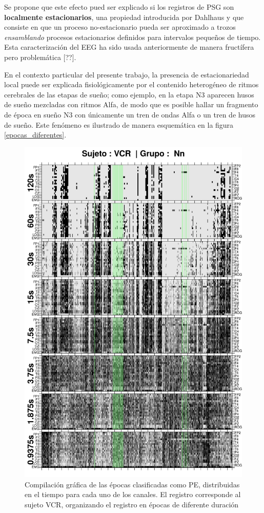 Se propone que este efecto pued ser explicado si los registros de PSG son \textbf{localmente
estacionarios}, una propiedad introducida por Dahlhaus \cite{Dahlhaus97} y que consiste en que un
proceso no-estacionario pueda ser aproximado a trozos \textit{ensamblando} procesos estacionarios
definidos para intervalos pequeños de tiempo.
Esta caracterización del EEG ha sido usada anteriormente de manera fructífera pero problemática
[??].

En el contexto particular del presente trabajo, la presencia de estacionariedad local puede ser
explicada fisiológicamente por el contenido heterogéneo de ritmos cerebrales de las etapas de 
sueño; como ejemplo, en la etapa N3 aparecen husos de sueño mezcladas con ritmos Alfa, de modo
que es posible hallar un fragmento de época en sueño N3 con únicamente un tren de ondas Alfa
o un tren de husos de sueño.
Este fenómeno es ilustrado de manera esquemática en la figura \ref{epocas_diferentes}.

\begin{figure}
\centering
\includegraphics[width=0.7\linewidth]
{./img_ejemplos/VCNNS1_comp_est_.png}
\caption{Compilación gráfica de las épocas clasificadas como PE, distribuidas en el tiempo
para cada uno de los canales. El registro corresponde al sujeto VCR, organizando el registro en
épocas de diferente duración}
\label{comp_VCR}
\end{figure}

